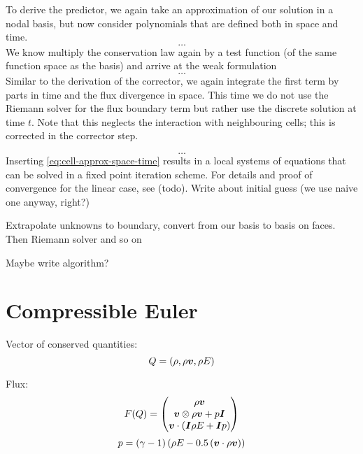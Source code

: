 To derive the predictor, we again take an approximation of our solution in a nodal basis, but now consider polynomials that are defined both in space and time.
\begin{equation}
  \ldots
\end{equation}
We know multiply the conservation law again by a test function (of the same function space as the basis) and arrive at the weak formulation
\begin{equation}
  \label{eq:weak-pde-space-time}
 \ldots
\end{equation}
Similar to the derivation of the corrector, we again integrate the first term by parts in time and the flux divergence in space.
This time we do not use the Riemann solver for the flux boundary term but rather use the discrete solution at time $t$.
Note that this neglects the interaction with neighbouring cells; this is corrected in the corrector step.

\begin{equation}
  \label{eq:space-time-predictor}
  \ldots
\end{equation}
Inserting \cref{eq:cell-approx-space-time} results in a local systems of equations that can be solved in a fixed point iteration scheme.
For details and proof of convergence for the linear case, see (todo).
Write about initial guess (we use naive one anyway, right?)

Extrapolate unknowns to boundary, convert from our basis to basis on faces.
Then Riemann solver
and so on

Maybe write algorithm?




\section{Compressible Euler}
Vector of conserved quantities:
\begin{equation}
  \label{eq:conserved-variables}
 Q = \left( \rho, \rho \bm{v}, \rho E \right) 
\end{equation}

\newcommand{\eulerFlux}{%
  \begin{pmatrix}
    \Qj \\
    \Qv  \otimes \Qj + \pressure \bm{I}  \\
    \Qv \cdot (\bm{I} \QE + \bm{I} \pressure)
  }
Flux:
\begin{equation}
  F(Q) = \eulerFlux
  \end{pmatrix}
\end{equation}
\begin{equation}
  p = (\gamma - 1) \left(\rho E - 0.5 \left(\bm{v} \cdot \rho \bm{v} \right) \right)
\end{equation}

